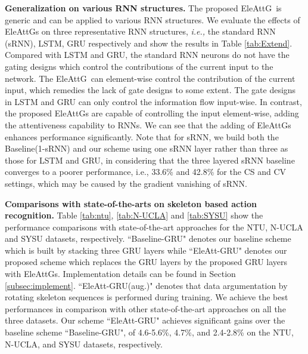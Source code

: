 \documentclass[runningheads]{llncs}
\newcommand{\EleAttGn}{{EleAttG}}
\newcommand{\EleAttG}{{EleAttG~}}
\begin{document}
\noindent\textbf{Generalization on various RNN structures.} The proposed \EleAttG is generic and can be applied to various RNN structures. We evaluate the effects of {\EleAttGn}s on three representative RNN structures, {\it i.e.,} the standard RNN (sRNN), LSTM, GRU respectively and show the results in Table \ref{tab:Extend}. Compared with LSTM and GRU, the standard RNN neurons do not have the gating designs which control the contributions of the current input to the network. The \EleAttG can element-wise control the contribution of the current input, which remedies the lack of gate designs to some extent. The gate designs in LSTM and GRU can only control the information flow input-wise. In contrast, the proposed {\EleAttGn}s are capable of controlling the input element-wise, adding the attentiveness capability to RNNs. We can see that the adding of {\EleAttGn}s  enhances performance significantly. Note that for sRNN, we build both the Baseline(1-sRNN) and our scheme using one sRNN layer rather than three as those for LSTM and GRU, in considering that the three layered sRNN baseline converges to a poorer performance, i.e., 33.6\% and 42.8\% for the CS and CV settings, which may be caused by the gradient vanishing of sRNN. 




\noindent\textbf{Comparisons with state-of-the-arts on skeleton based action recognition.}
Table \ref{tab:ntu}, \ref{tab:N-UCLA} and \ref{tab:SYSU} show the performance comparisons with state-of-the-art approaches for the NTU, N-UCLA and SYSU datasets, respectively. ``Baseline-GRU" denotes our baseline scheme which is built by stacking three GRU layers while ``EleAtt-GRU" denotes our proposed scheme which replaces the GRU layers by the proposed GRU layers with {\EleAttGn}s. Implementation details can be found in Section \ref{subsec:implement}.  ``EleAtt-GRU(aug.)" denotes that data argumentation by rotating skeleton sequences is performed during training. We achieve the best performances in comparison with other state-of-the-art approaches on all the three datasets. Our scheme ``EleAtt-GRU" achieves significant gains over the baseline scheme ``Baseline-GRU", of 4.6-5.6\%, 4.7\%, and 2.4-2.8\% on the NTU, N-UCLA, and SYSU datasets, respectively. 
\end{document}
